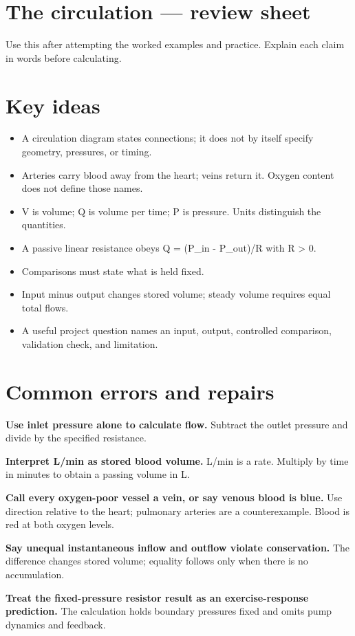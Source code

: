 \documentclass[11pt,letterpaper]{article}
\theoremstyle{definition}\newtheorem{definition}{Definition}\newtheorem{example}{Example}
\numberwithin{equation}{section}
\begin{document}
\section*{The circulation --- review sheet}
Use this after attempting the worked examples and practice. Explain each claim in words before calculating.

\section*{Key ideas}
\begin{itemize}
\item A circulation diagram states connections; it does not by itself specify geometry, pressures, or timing.
\item Arteries carry blood away from the heart; veins return it. Oxygen content does not define those names.
\item V is volume; Q is volume per time; P is pressure. Units distinguish the quantities.
\item A passive linear resistance obeys Q =\allowbreak{} (P\_in - P\_out)/R with R > 0.
\item Comparisons must state what is held fixed.
\item Input minus output changes stored volume; steady volume requires equal total flows.
\item A useful project question names an input, output, controlled comparison, validation check, and limitation.
\end{itemize}
\section*{Common errors and repairs}
\textbf{Use inlet pressure alone to calculate flow.} Subtract the outlet pressure and divide by the specified resistance.

\textbf{Interpret L/min as stored blood volume.} L/min is a rate. Multiply by time in minutes to obtain a passing volume in L.

\textbf{Call every oxygen-poor vessel a vein, or say venous blood is blue.} Use direction relative to the heart; pulmonary arteries are a counterexample. Blood is red at both oxygen levels.

\textbf{Say unequal instantaneous inflow and outflow violate conservation.} The difference changes stored volume; equality follows only when there is no accumulation.

\textbf{Treat the fixed-pressure resistor result as an exercise-response prediction.} The calculation holds boundary pressures fixed and omits pump dynamics and feedback.
\end{document}
